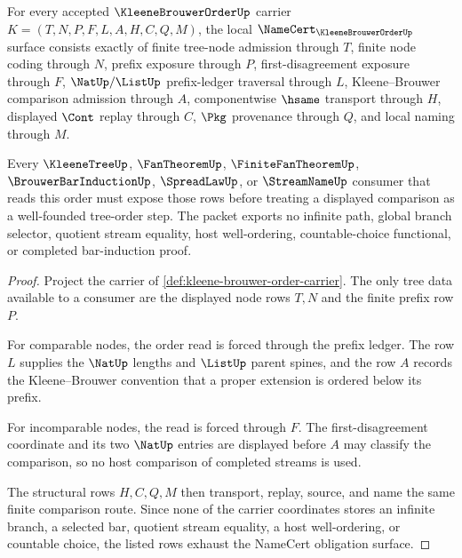 \begin{theorem}
\label{thm:kleene-brouwer-order-namecert-obligation-surface}
For every accepted $\KleeneBrouwerOrderUp$ carrier $K=(T,N,P,F,L,A,H,C,Q,M)$, the local $\NameCert_{\KleeneBrouwerOrderUp}$ surface consists exactly of finite tree-node admission through $T$, finite node coding through $N$, prefix exposure through $P$, first-disagreement exposure through $F$, $\NatUp/\ListUp$ prefix-ledger traversal through $L$, Kleene--Brouwer comparison admission through $A$, componentwise $\hsame$ transport through $H$, displayed $\Cont$ replay through $C$, $\Pkg$ provenance through $Q$, and local naming through $M$.

Every $\KleeneTreeUp$, $\FanTheoremUp$, $\FiniteFanTheoremUp$, $\BrouwerBarInductionUp$, $\SpreadLawUp$, or $\StreamNameUp$ consumer that reads this order must expose those rows before treating a displayed comparison as a well-founded tree-order step. The packet exports no infinite path, global branch selector, quotient stream equality, host well-ordering, countable-choice functional, or completed bar-induction proof.
\end{theorem}
\begin{proof}
Project the carrier of \autoref{def:kleene-brouwer-order-carrier}. The only tree data available to a consumer are the displayed node rows $T,N$ and the finite prefix row $P$.

For comparable nodes, the order read is forced through the prefix ledger. The row $L$ supplies the $\NatUp$ lengths and $\ListUp$ parent spines, and the row $A$ records the Kleene--Brouwer convention that a proper extension is ordered below its prefix.

For incomparable nodes, the read is forced through $F$. The first-disagreement coordinate and its two $\NatUp$ entries are displayed before $A$ may classify the comparison, so no host comparison of completed streams is used.

The structural rows $H,C,Q,M$ then transport, replay, source, and name the same finite comparison route. Since none of the carrier coordinates stores an infinite branch, a selected bar, quotient stream equality, a host well-ordering, or countable choice, the listed rows exhaust the NameCert obligation surface.
\end{proof}


